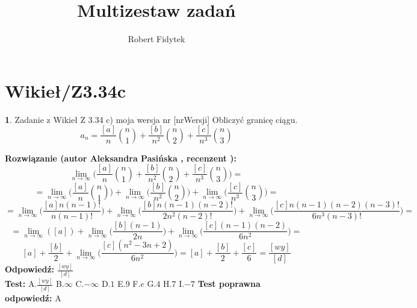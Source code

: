 \documentclass[12pt, a4paper]{article}
\title{Multizestaw zadań}
\author{Robert Fidytek}
\date{}
\theoremstyle{definition} %
\newtheorem{zad}{}
\newcommand{\kategoria}[1]{\section{#1}} %
\newcommand{\zadStart}[1]{\begin{zad}#1\newline} %
\newcommand{\zadStop}{\end{zad}}   %
\newcommand{\rozwStart}[2]{\noindent \textbf{Rozwiązanie (autor #1 , recenzent #2): }\newline} %
\newcommand{\rozwStop}{\newline}                                            %
\newcommand{\odpStart}{\noindent \textbf{Odpowiedź:}\newline}    %
\newcommand{\odpStop}{\newline}                                             %
\newcommand{\testStart}{\noindent \textbf{Test:}\newline} %
\newcommand{\testStop}{\newline} %
\newcommand{\kluczStart}{\noindent \textbf{Test poprawna odpowiedź:}\newline} %
\newcommand{\kluczStop}{\newline} %
\begin{document}
\maketitle


\kategoria{Wikieł/Z3.34c}
\zadStart{Zadanie z Wikieł Z 3.34 c) moja wersja nr [nrWersji]}
Obliczyć granicę ciągu. $$a_n=\frac{[a]}{n}\binom{n}{1}+\frac{[b]}{n^2}\binom{n}{2}+\frac{[c]}{n^3}\binom{n}{3}$$
\zadStop
\rozwStart{Aleksandra Pasińska}{}
$$\lim_{n\rightarrow \infty}\biggl(\frac{[a]}{n}\binom{n}{1}+\frac{[b]}{n^2}\binom{n}{2}+\frac{[c]}{n^3}\binom{n}{3}\biggr)=$$
$$=\lim_{n\rightarrow \infty}\biggl(\frac{[a]}{n}\binom{n}{1}\biggr)+\lim_{n\rightarrow \infty}\biggl(\frac{[b]}{n^2}\binom{n}{2}\biggr)+\lim_{n\rightarrow \infty}\biggl(\frac{[c]}{n^3}\binom{n}{3}\biggr)=$$
$$=\lim_{n\rightarrow \infty}\biggl(\frac{[a]n(n-1)!}{n(n-1)!}\biggr)+\lim_{n\rightarrow \infty}\biggl(\frac{[b]n(n-1)(n-2)!}{2n^2(n-2)!}\biggr)+\lim_{n\rightarrow \infty}\biggl(\frac{[c]n(n-1)(n-2)(n-3)!}{6n^3(n-3)!}\biggr)=$$
$$=\lim_{n\rightarrow \infty}([a])+\lim_{n\rightarrow \infty}\biggl(\frac{[b](n-1)}{2n}\biggr)+\lim_{n\rightarrow \infty}\biggl(\frac{[c](n-1)(n-2)}{6n^2}\biggr)=$$
$$[a]+\frac{[b]}{2}+\lim_{n\rightarrow \infty}\biggl(\frac{[c](n^2-3n+2)}{6n^2}\biggr)=[a]+\frac{[b]}{2}+\frac{[c]}{6}=\frac{[wy]}{[d]}$$
\rozwStop
\odpStart
$\frac{[wy]}{[d]}$\\
\odpStop
\testStart
A.$\frac{[wy]}{[d]}$
B.$\infty$
C.$-\infty$
D.$1$
E.$9$
F.$e$
G.$4$
H.$7$
I.$-7$
\testStop
\kluczStart
A
\kluczStop
\end{document}
